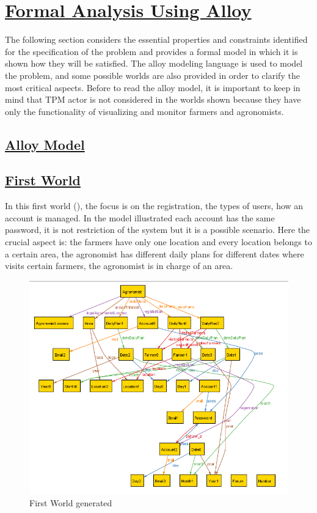 \section[Formal Analysis Using Alloy]{\hyperlink{toc}{Formal Analysis Using Alloy}}
	\label{sec:formalAnalysisUsingAlloy}
	The following section considers the essential properties and constraints identified for the specification of the problem and provides a formal model in which it is shown how they will be satisfied. The alloy modeling language is used to model the problem, and some possible worlds are also provided in order to clarify the most critical aspects. Before to read the alloy model, it is important to keep in mind that TPM actor is not considered in the worlds shown because they have only the functionality of visualizing and monitor farmers and agronomists. 
	
	\subsection[Alloy Model]{\hyperlink{toc}{Alloy Model}}
	
	
	\FloatBarrier
	\newpage
	
	\subsection[First World]{\hyperlink{toc}{First World}}
	In this first world (), the focus is on the registration, the types of users, how an account is managed. In the model illustrated each account has the same password, it is not restriction of the system but it is a possible scenario. Here the crucial aspect is: the farmers have only one location and every location belongs to a certain area, the agronomist has different daily plans for different dates where visits certain farmers, the agronomist is in charge of an area.
	
	\begin{figure}[h!]
		\centering
		\includegraphics[scale=0.8]{Files/alloy/world1.png}
		\caption{\label{fig:firstWorld}First World generated}
	\end{figure}

